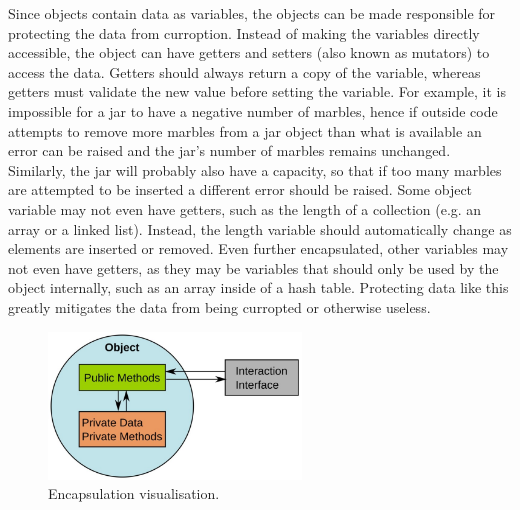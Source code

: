 \documentclass[11pt]{article}
\begin{document}
Since objects contain data as variables, the objects can be made responsible for protecting the data from curroption. Instead of making the variables directly accessible, the object can have getters and setters (also known as mutators) to access the data. Getters should always return a copy of the variable, whereas getters must validate the new value before setting the variable. For example, it is impossible for a jar to have a negative number of marbles, hence if outside code attempts to remove more marbles from a jar object than what is available an error can be raised and the jar's number of marbles remains unchanged. Similarly, the jar will probably also have a capacity, so that if too many marbles are attempted to be inserted a different error should be raised. Some object variable may not even have getters, such as the length of a collection (e.g. an array or a linked list). Instead, the length variable should automatically change as elements are inserted or removed. Even further encapsulated, other variables may not even have getters, as they may be variables that should only be used by the object internally, such as an array inside of a hash table. Protecting data like this greatly mitigates the data from being curropted or otherwise useless.

\begin{figure}[b!]
    \centering
    \includegraphics[width=0.6\textwidth]{figures/encapsulation.jpg}
    \caption{Encapsulation visualisation.}
    \label{fig:encapsulation}
\end{figure}
\end{document}

